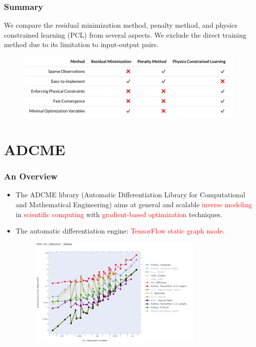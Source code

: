 \documentclass{beamer}
\begin{document}
\begin{frame}
	\frametitle{Summary}
	We compare the residual minimization method, penalty method, and physics constrained learning (PCL) from several aspects. We exclude the direct training method due to its limitation to input-output pairs. 

\begin{figure}[hbt]
\centering
  \includegraphics[width=1.0\textwidth]{figures/comparetrain}
\end{figure}

\end{frame}


\section{ADCME}

\begin{frame}
	\frametitle{An Overview}
	
	\begin{itemize}
		\item The ADCME library (Automatic Differentiation Library for Computational and Mathematical Engineering) aims at general and scalable \textcolor{red}{inverse modeling} in \textcolor{red}{scientific computing} with \textcolor{red}{gradient-based optimization} techniques.
		\item The automatic differentiation engine: \textcolor{red}{TensorFlow static graph mode}. 
		\begin{figure}[hbt]
  \includegraphics[width=0.8\textwidth]{figures/reverseAD}
\end{figure}

	\end{itemize}
\end{frame}
\end{document}
